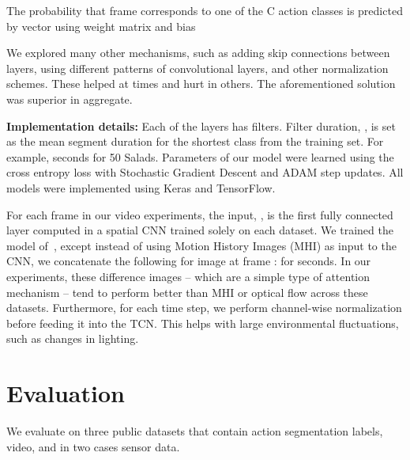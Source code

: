 \documentclass[10pt,twocolumn,letterpaper]{article}
\newcommand{\fakesubsection}[1]{\smallskip\noindent\textbf{#1:}}
\begin{document}
The probability that frame  corresponds to one of the C action classes is predicted by vector  using weight matrix  and bias 


We explored many other mechanisms, such as adding skip connections between layers, using different patterns of convolutional layers, and other normalization schemes. These helped at times and hurt in others. The aforementioned solution was superior in aggregate. 





\fakesubsection{Implementation details}
Each of the  layers has  filters. Filter duration, , is set as the mean segment duration for the shortest class from the training set. For example,  seconds for 50 Salads. 
Parameters of our model were learned using the cross entropy loss with Stochastic Gradient Descent and ADAM step updates. 
All models were implemented using Keras and TensorFlow.


For each frame in our video experiments, the input, , is the first fully connected layer computed in a spatial CNN trained solely on each dataset. We trained the model of~\cite{lea_eccv_2016}, except instead of using Motion History Images (MHI) as input to the CNN, we concatenate the following for image  at frame :  for  seconds. 
In our experiments, these difference images -- which are a simple type of attention mechanism -- tend to perform better than MHI or optical flow across these datasets. 
Furthermore, for each time step, we perform channel-wise normalization before feeding it into the TCN. This helps with large environmental fluctuations, such as changes in lighting. 




 
\section{Evaluation}
\label{sec:evaluation}

We evaluate on three public datasets that contain action segmentation labels, video, and in two cases sensor data.
\end{document}
